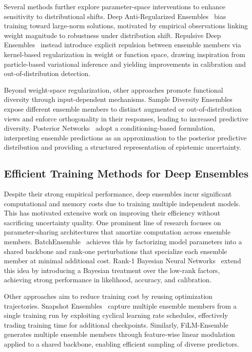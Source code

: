 \documentclass[sigconf]{acmart}
\begin{document}
Several methods further explore parameter-space interventions to enhance sensitivity to distributional shifts. Deep Anti-Regularized Ensembles~\citep{demathelin2023deepantiregularizedensemblesprovide} bias training toward large-norm solutions, motivated by empirical observations linking weight magnitude to robustness under distribution shift. Repulsive Deep Ensembles~\citep{dangelo2021repulsive} instead introduce explicit repulsion between ensemble members via kernel-based regularization in weight or function space, drawing inspiration from particle-based variational inference and yielding improvements in calibration and out-of-distribution detection.

Beyond weight-space regularization, other approaches promote functional diversity through input-dependent mechanisms. Sample Diversity Ensembles~\citep{mehrtens2022sample} expose different ensemble members to distinct augmented or out-of-distribution views and enforce orthogonality in their responses, leading to increased predictive diversity. Posterior Networks~\citep{charpentier2020posterior} adopt a conditioning-based formulation, interpreting ensemble predictions as an approximation to the posterior predictive distribution and providing a structured representation of epistemic uncertainty.

\subsection{Efficient Training Methods for Deep Ensembles}

Despite their strong empirical performance, deep ensembles incur significant computational and memory costs due to training multiple independent models. This has motivated extensive work on improving their efficiency without sacrificing uncertainty quality. One prominent line of research focuses on parameter-sharing architectures that amortize computation across ensemble members. BatchEnsemble~\citep{wen2020batchensemble} achieves this by factorizing model parameters into a shared backbone and rank-one perturbations that specialize each ensemble member at minimal additional cost. Rank-1 Bayesian Neural Networks~\citep{dusenberry2020efficient} extend this idea by introducing a Bayesian treatment over the low-rank factors, achieving strong performance in likelihood, accuracy, and calibration.

Other approaches aim to reduce training cost by reusing optimization trajectories. Snapshot Ensembles~\citep{huang2017snapshot} capture multiple ensemble members from a single training run by exploiting cyclical learning rate schedules, effectively trading training time for additional checkpoints. Similarly, FiLM-Ensemble~\citep{turkoglu2022film} generates multiple ensemble members through feature-wise linear modulation applied to a shared backbone, enabling efficient sampling of diverse predictors.
\end{document}
